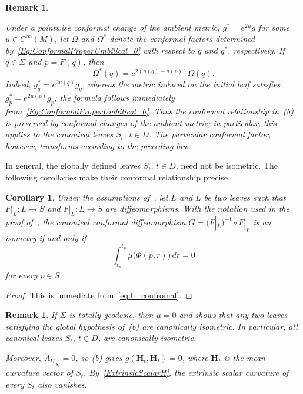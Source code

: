 \documentclass[11pt]{article}
\numberwithin{equation}{section}
\newtheorem{corollary}[theorem]{Corollary}
\newtheorem{remark}[theorem]{Remark}
\begin{document}
\begin{remark}
	\label{remark:Omega_conformal_invariance}
	\normalfont
	
	Under a pointwise conformal change of the ambient metric, $g^* = e^{2u}g$ for some $u \in C^{\infty}(M)$, let $\Omega$ and $\Omega^*$ denote the conformal factors determined by~\eqref{Eq:ConformalProperUmbilical_0} with respect to $g$ and $g^*$, respectively. If $q\in\Sigma$ and $p=F(q)$, then
	\[
		\Omega^*(q)=e^{2(u(q)-u(p))}\Omega(q).
	\]
	Indeed, $g_q^*=e^{2u(q)}g_q$, whereas the metric induced on the initial leaf satisfies $g_p^*=e^{2u(p)}g_p$; the formula follows immediately from~\eqref{Eq:ConformalProperUmbilical_0}. Thus the conformal relationship in~(b) is preserved by conformal changes of the ambient metric; in particular, this applies to the canonical leaves $S_t$, $t\in D$. The particular conformal factor, however, transforms according to the preceding law.
\end{remark}
	
In general, the globally defined leaves $S_t$, $t\in D$, need not be isometric. The following corollaries make their conformal relationship precise.
	
\begin{corollary}\label{Cor:isometry_condition}
		Under the assumptions of~, let $L$ and
		$\overline L$ be two leaves such that
		$F|_L\colon L\to S$ and
		$F|_{\overline L}\colon\overline L\to S$ are diffeomorphisms.
		With the notation used in the proof of~,
		the canonical conformal diffeomorphism
		$G=(F|_{\overline L})^{-1}\circ F|_L$ is an isometry if and only if
		\[
			\int_{\overline t_p}^{t_p}
			\mu\bigl(\Phi(p,r)\bigr)\,dr=0
		\]
		for every $p\in S$.
	\end{corollary}
	\begin{proof}
		This is immediate from~\eqref{eq:h_confromal}.
	\end{proof}

	\begin{remark}\normalfont
		If $\Sigma$ is totally geodesic, then $\mu=0$ and
		 shows that any two leaves satisfying
		the global hypothesis of~(b) are
		canonically isometric. In particular, all canonical leaves
		$S_t$, $t\in D$, are canonically isometric.

		Moreover, $A_{U|_{S_t}}=0$, so
		(b) gives
		$g(\mathbf H_t,\mathbf H_t)=0$, where $\mathbf H_t$ is the mean
		curvature vector of $S_t$. By~\eqref{ExtrinsicScalarH}, the
		extrinsic scalar curvature of every $S_t$ also vanishes.
	\end{remark}
\end{document}
